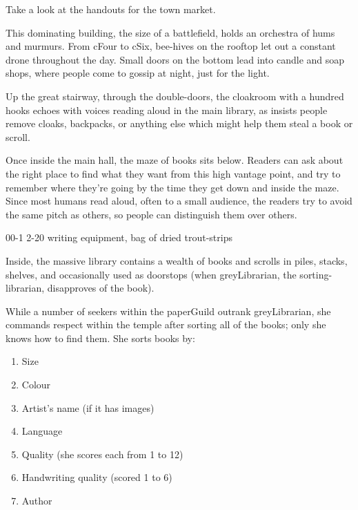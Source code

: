 \begin{multicols}{2}
Take a look at the handouts for the \gls{town} market.


This dominating building, the size of a battlefield, holds an orchestra of hums and murmurs.
From \gls{cFour} to \gls{cSix}, bee-hives on the rooftop let out a constant drone throughout the day.
Small doors on the bottom lead into candle and soap shops, where people come to gossip at night, just for the light.

Up the great stairway, through the double-doors, the cloakroom with a hundred hooks echoes with voices reading aloud in the main library, as  insists people remove cloaks, backpacks, or anything else which might help them steal a book or scroll.

Once inside the main hall, the maze of books sits below.
Readers can ask about the right place to find what they want from this high vantage point, and try to remember where they're going by the time they get down and inside the maze.
Since most humans read aloud, often to a small audience, the readers try to avoid the same pitch as others, so people can distinguish them over others.

\label{greyLibrarian}
%
  {{0}{0}{-1}}%
  {{2}{-2}{0}}%
  {
    \setcounter{Academics}{3}
    \setcounter{Crafts}{1}
    \setcounter{Empathy}{1}
  }%
  {%
  }%
  {writing equipment, bag of dried trout-strips}%
  {}%

Inside, the massive library contains a wealth of books and scrolls in piles, stacks, shelves, and occasionally used as doorstops (when \gls{greyLibrarian}, the sorting-librarian, disapproves of the book).

While a number of \glspl{seeker} within the \gls{paperGuild} outrank \gls{greyLibrarian}, she commands respect within the temple after sorting all of the books; only she knows how to find them.
She sorts books by:

\begin{multicols}{2}
\begin{enumerate}
  \item
  Size
  \item
  Colour
  \item
  Artist's name (if it has images)
  \item
  Language
  \item
  Quality (she scores each from 1 to 12)
  \item
  Handwriting quality (scored 1 to 6)
  \item
  Author
\end{enumerate}
\end{multicols}


\end{multicols}
